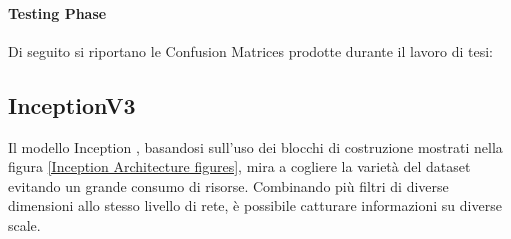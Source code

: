         \paragraph{Testing Phase}
        Di seguito si riportano le Confusion Matrices prodotte durante il lavoro di tesi:
            \begin{figure}[!h]
                \centering
                \quad
                \caption{}
                \label{MobileNetV2 Confusion Matrix}
            \end{figure}
        \newpage
        
    \subsection{InceptionV3}
    \label{InceptionV3}
    Il modello Inception \cite{szegedy2015rethinking}, basandosi sull'uso dei blocchi di costruzione mostrati nella figura \ref{Inception Architecture figures}, mira a cogliere la varietà del dataset evitando un grande consumo di risorse.
    Combinando più filtri di diverse dimensioni allo stesso livello di rete, è possibile catturare informazioni su diverse scale.
